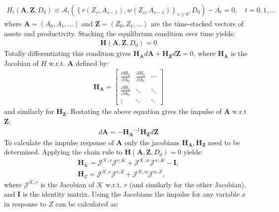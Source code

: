 \begin{gather*}
H_{t}\left(\boldsymbol{A},\mathbf{Z},D_{0}\right)\equiv\mathcal{A}_{t}\left(\left\{ r\left(Z_{s},A_{s-1}\right),w\left(Z_{s},A_{s-1}\right)\right\} _{s\geq0},D_{0}\right)-A_{t}=0,\quad t=0,1,\ldots
\end{gather*}
where $\boldsymbol{A}=\left(A_{0},A_{1},...\right)$ and $\boldsymbol{Z}=\left(Z_{0},Z_{1},...\right)$ are the time-stacked vectors of assets and productivity. Stacking the equilibrium condition over time yields: 
\begin{gather*}
\boldsymbol{H}\left(\boldsymbol{A},\mathbf{Z},D_{0}\right)=0
\end{gather*}
Totally differentiating this condition gives $\boldsymbol{H_{A}}d\boldsymbol{A}+\boldsymbol{H_{Z}}d\boldsymbol{Z}=0$, where $\boldsymbol{H_{A}}$ is the Jacobian of $H$ w.r.t. $\boldsymbol{A}$ defined by:
\begin{gather*}
\boldsymbol{H_{A}}=\left[\begin{array}{ccc}
\frac{\partial H_{0}}{\partial A_{0}} & \frac{\partial H_{0}}{\partial A_{1}} & \cdots \\
\frac{\partial H_{1}}{\partial A_{0}} & \ddots & \ddots \\
\vdots & \ddots & \ddots
\end{array}\right]
\end{gather*}
and similarly for $\boldsymbol{H_Z}$. Restating the above equation gives the impulse of $\boldsymbol{A}$ w.r.t $\boldsymbol{Z}$:
\begin{gather*}
d\boldsymbol{A}=-\boldsymbol{H_{A}}^{-1}\boldsymbol{H_{Z}}d\boldsymbol{Z}
\end{gather*}
To calculate the impulse response of $\boldsymbol{A}$ only the jacobians $\boldsymbol{H_{A}},\boldsymbol{H_{Z}}$ need to be determined. Applying the chain rule to $\boldsymbol{H}\left(\boldsymbol{A},\mathbf{Z},D_{0}\right)=0$ yields:
\begin{gather*}
\boldsymbol{H}_{K}=\mathcal{J}^{\mathcal{K}, r} \mathcal{J}^{r, K}+\mathcal{J}^{\mathcal{K}, w} \mathcal{J}^{w, K}-\boldsymbol{I}, \\
\boldsymbol{H}_{Z}=\mathcal{J}^{\mathcal{K},r}\mathcal{J}^{r,Z}+\mathcal{J}^{\mathcal{K},w}\mathcal{J}^{w,Z},
\end{gather*}
where $\mathcal{J}^{\mathcal{K},r}$ is the Jacobian of $\mathcal{K}$ w.r.t. $r$ (and similarly for the other Jacobian), and $\boldsymbol{I}$ is the identity matrix. Using the Jacobians the impulse for any variable $x$ in response to $Z$ can be calculated as:

